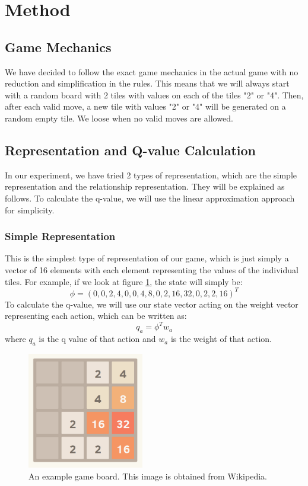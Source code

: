 \section{Method}
\subsection{Game Mechanics}
We have decided to follow the exact game mechanics in the actual game with no reduction and simplification in the rules. This means that we will always start with a random board with 2 tiles with values on each of the tiles "2" or "4". Then, after each valid move, a new tile with values "2" or "4" will be generated  on a random empty tile. We loose when no valid moves are allowed.

\subsection{Representation and Q-value Calculation}
In our experiment, we have tried 2 types of representation, which are the simple representation and the relationship representation. They will be explained as follows. To calculate the q-value, we will use the linear approximation approach for simplicity.

\subsubsection{Simple Representation}
This is the simplest type of representation of our game, which is just simply a vector of 16 elements with each element representing the values of the individual tiles. For example, if we look at figure \ref{fig:game_board}, the state will simply be:
\begin{equation*}
\phi = (0,0,2,4,0,0,4,8,0,2,16,32,0,2,2,16)^{T}
\end{equation*}
To calculate the q-value, we will use our state vector acting on the weight vector representing each action, which can be written as:
\begin{equation*}
q_{a} = \phi ^{T} w_{a}
\end{equation*}
where $q_{a}$ is the q value of that action and $w_{a}$ is the weight of that action.

\begin{figure}
	\centering
	\includegraphics[width=2.0in]{2048_Screenshot}
	\caption{An example game board. This image is obtained from Wikipedia.}
	\label{fig:game_board}
\end{figure}

